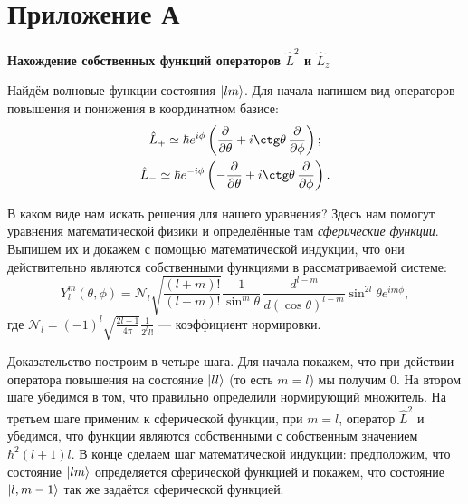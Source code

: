 \section{Приложение А}\label{appendix:A}
\begin{center}
  \textbf{\Large{Нахождение собственных функций операторов $\hat{L}^2$ и
      $\hat{L}_z$}}
\end{center}

Найдём волновые функции состояния $\lvert lm\rangle$. Для начала напишем вид операторов
повышения и понижения в координатном базисе:
\begin{gather*}
  \hat{L}_+ \simeq \hbar e^{i\phi}\left(\pd{}{\theta} + i \ctg\theta\,\pd{}{\phi} \right);\\
  \hat{L}_- \simeq \hbar e^{-i\phi}\left(-\pd{}{\theta} + i \ctg\theta\,\pd{}{\phi} \right).
\end{gather*}

В каком виде нам искать решения для нашего уравнения? Здесь нам помогут
уравнения математической физики и определённые там \textit{сферические
  функции}. Выпишем их и докажем с помощью математической индукции, что они
действительно являются собственными функциями в рассматриваемой системе:
\[
  Y^m_l(\theta, \phi) = \mathcal{N}_l\sqrt{\frac{(l+m)!}{(l-m)!}} \frac{1}{\sin^{m}\theta}\,\frac{d^{l-m}}{d(\cos\theta)^{l-m}}\sin^{2l}\theta e^{im\phi},
\]
где $\mathcal{N}_l = (-1)^l \sqrt{\frac{2l+1}{4\pi}}\frac{1}{2^l l!}$ ---
коэффициент нормировки.

Доказательство построим в четыре шага. Для начала покажем, что при действии
оператора повышения на состояние $\lvert ll\rangle$ (то есть $m = l$) мы получим 0. На
втором шаге убедимся в том, что правильно определили нормирующий множитель. На
третьем шаге применим к сферической функции, при $m = l$, оператор $\hat{L}^2$
и убедимся, что функции являются собственными с собственным значением
$\hbar^2(l+1)l$. В конце сделаем шаг математической индукции: предположим, что
состояние $\lvert lm\rangle$ определяется сферической функцией и покажем, что состояние
$\lvert l, m-1\rangle$ так же задаётся сферической функцией.

